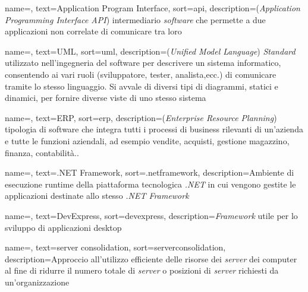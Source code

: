 
%

{
    name=,
    text=Application Program Interface,
    sort=api,
    description={(\emph{Application Programming Interface API})
    intermediario \textit{software} che permette a due
    applicazioni non correlate di comunicare tra loro}
}

{
    name=,
    text=UML,
    sort=uml,
    description={(\emph{Unified Model Language})
    \textit{Standard} utilizzato nell'ingegneria del software
    per descrivere un sistema informatico, consentendo ai
    vari ruoli (sviluppatore, tester, analista,ecc.) di
    comunicare tramite lo stesso linguaggio. Si avvale di
    diversi tipi di diagrammi, statici e dinamici,
    per fornire diverse viste di uno stesso sistema}
}

{
    name=,
    text=ERP,
    sort=erp,
    description={(\emph{Enterprise Resource Planning})
    tipologia di software che integra tutti i processi
    di business rilevanti di un'azienda e tutte le funzioni
    aziendali, ad esempio vendite, acquisti, gestione magazzino,
    finanza, contabilità..}
}

{
    name=,
    text=.NET Framework,
    sort=.netframework,
    description={Ambiente di esecuzione runtime
    della piattaforma tecnologica \textit{.NET} in cui
    vengono gestite le applicazioni destinate allo stesso
    \textit{.NET Framework}}
}

{
    name=,
    text=DevExpress,
    sort=devexpress,
    description={\textit{Framework} utile per lo sviluppo
    di applicazioni desktop}
}

{
    name=,
    text=server consolidation,
    sort=serverconsolidation,
    description={Approccio all'utilizzo efficiente
    delle risorse dei \textit{server} dei computer al fine di
    ridurre il numero totale di \textit{server} o posizioni di
    \textit{server} richiesti da un'organizzazione}
}

